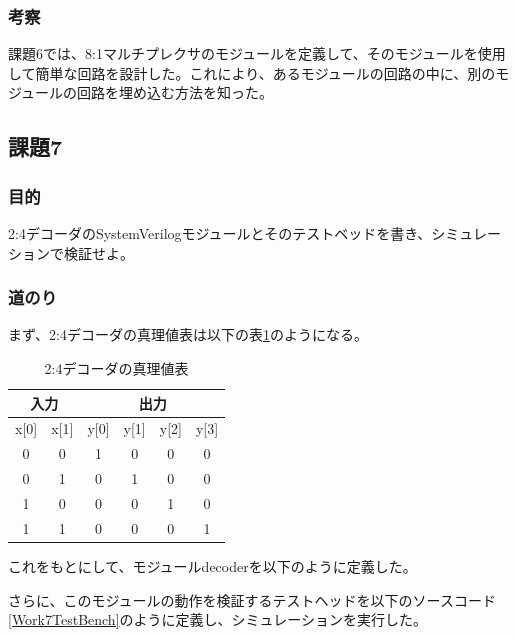 \documentclass[a4paper]{jarticle}
\begin{document}
\subsubsection{考察}
課題6では、8:1マルチプレクサのモジュールを定義して、そのモジュールを使用して簡単な回路を設計した。これにより、あるモジュールの回路の中に、別のモジュールの回路を埋め込む方法を知った。
\subsection{課題7}
\subsubsection{目的}
2:4デコーダのSystemVerilogモジュールとそのテストベッドを書き、シミュレーションで検証せよ。
\subsubsection{道のり}
まず、2:4デコーダの真理値表は以下の表\ref{Work7TruthTable}のようになる。
\begin{table}[ht]
	\begin{center}
		\caption{2:4デコーダの真理値表}
		\label{Work7TruthTable}
		\begin{tabular}{|c|c||c|c|c|c|}
			\hline
			\multicolumn{2}{|c|}{入力} & \multicolumn{4}{|c|}{出力}\\	\hline\hline
			x[0]	&x[1]	&y[0]	&y[1]	&y[2]	&y[3]\\	\hline\hline
			0	&0	&1	&0	&0	&0\\	\hline
			0	&1	&0	&1	&0	&0\\	\hline
			1	&0	&0	&0	&1	&0\\	\hline
			1	&1	&0	&0	&0	&1\\	\hline
		\end{tabular}
	\end{center}
\end{table}
これをもとにして、モジュールdecoderを以下のように定義した。

さらに、このモジュールの動作を検証するテストヘッドを以下のソースコード\ref{Work7TestBench}のように定義し、シミュレーションを実行した。

\end{document}
